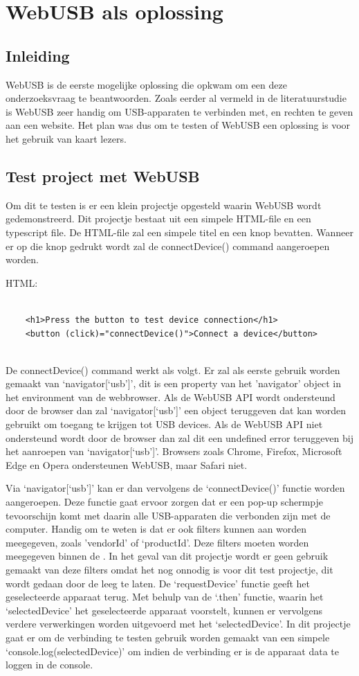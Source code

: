 \section{WebUSB als oplossing}

\subsection{Inleiding}
WebUSB is de eerste mogelijke oplossing die opkwam om een deze onderzoeksvraag te beantwoorden. Zoals eerder al vermeld in de literatuurstudie is WebUSB zeer handig om USB-apparaten te verbinden met, en rechten te geven aan een website. Het plan was dus om te testen of WebUSB een oplossing is voor het gebruik van kaart lezers. 

\subsection{Test project met WebUSB}
Om dit te testen is er een klein projectje opgesteld waarin WebUSB wordt gedemonstreerd. Dit projectje bestaat uit een simpele HTML-file en een typescript file.  De HTML-file zal een simpele titel en een knop bevatten. Wanneer er op die knop gedrukt wordt zal de connectDevice() command aangeroepen worden. 

HTML: 
\begin{verbatim} 
    
    <h1>Press the button to test device connection</h1> 
    <button (click)="connectDevice()">Connect a device</button> 
    
\end{verbatim} 

De connectDevice() command werkt als volgt. Er zal als eerste gebruik worden gemaakt van ‘navigator[‘usb’]’, dit is een property van het 'navigator’ object in het environment van de webbrowser. Als de WebUSB API wordt ondersteund door de browser dan zal ‘navigator[‘usb’]’ een object teruggeven dat kan worden gebruikt om toegang te krijgen tot USB devices. Als de WebUSB API niet ondersteund wordt door de browser dan zal dit een undefined error teruggeven bij het aanroepen van ‘navigator[‘usb’]’. Browsers zoals Chrome, Firefox, Microsoft Edge en Opera ondersteunen WebUSB, maar Safari niet. 

Via ‘navigator[‘usb’]’ kan er dan vervolgens de ‘connectDevice()’ functie worden aangeroepen. Deze functie gaat ervoor zorgen dat er een pop-up schermpje tevoorschijn komt met daarin alle USB-apparaten die verbonden zijn met de computer. Handig om te weten is dat er ook filters kunnen aan worden meegegeven, zoals 'vendorId’ of ‘productId’. Deze filters moeten worden meegegeven binnen de { }. In het geval van dit projectje wordt er geen gebruik gemaakt van deze filters omdat het nog onnodig is voor dit test projectje, dit wordt gedaan door de { } leeg te laten. De ‘requestDevice’ functie geeft het geselecteerde apparaat terug. Met behulp van de ‘.then’ functie, waarin het ‘selectedDevice’ het geselecteerde apparaat voorstelt, kunnen er vervolgens verdere verwerkingen worden uitgevoerd met het ‘selectedDevice’. In dit projectje gaat er om de verbinding te testen gebruik worden gemaakt van een simpele ‘console.log(selectedDevice)’ om indien de verbinding er is de apparaat data te loggen in de console. 

